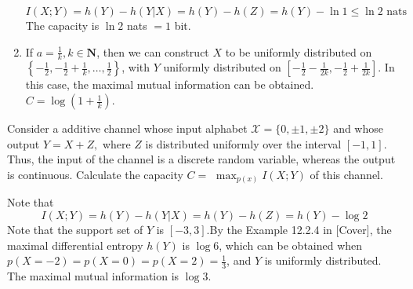 \begin{exercise}
\begin{solution}
\begin{enumerate}
    \begin{equation}
      I(X;Y) = h(Y) - h(Y|X) = h(Y) - h(Z) = h(Y) - \ln 1 \le \ln 2 \text{ nats}
    \end{equation}
    The capacity is $\ln 2$ nats $= 1$ bit.
    \item If $a = \frac{1}{k}, k\in \mathbf{N}$, then we can construct $X$ to be uniformly distributed on $\left\{-\frac{1}{2}, -\frac{1}{2} + \frac{1}{k}, \ldots,\frac{1}{2} \right\}$, with $Y$ uniformly distributed on $\left[-\frac{1}{2}-\frac{1}{2k}, -\frac{1}{2}+\frac{1}{2k} \right]$. In this case, the maximal mutual information can be obtained. $C = \log \left(1+ \frac{1}{k}\right)$.
  \end{enumerate}
  \end{solution}
  \label{ex3}
\end{exercise}


\begin{exercise}{ Consider a additive channel whose input alphabet $\mathcal{X}=\{0,\pm 1,\pm 2\}$ and whose output $Y=X+Z,$ where $Z$ is distributed uniformly over the interval $[-1,1] .$ Thus, the input of the channel is a discrete random variable, whereas the output is continuous. Calculate the capacity $C=$ $\max _{p(x)} I(X ; Y)$ of this channel.}
  \begin{solution}
  Note that
  \begin{equation}
    I(X;Y) = h(Y) - h(Y|X) = h(Y) -h(Z) = h(Y) - \log 2
  \end{equation}
  Note that the support set of $Y$ is $\left[-3,3\right]$.By the Example 12.2.4 in [Cover], the maximal differential entropy $h(Y)$ is $\log 6$, which can be obtained when $p(X=-2) = p(X=0) = p(X=2) = \frac{1}{3}$, and $Y$ is uniformly distributed. The maximal mutual information is $\log 3$.
  \end{solution}
  \label{ex4}
\end{exercise}




